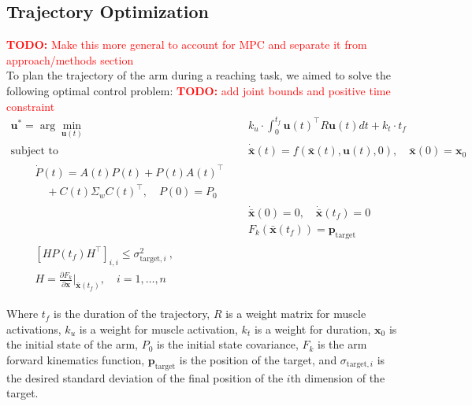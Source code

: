 \documentclass[letterpaper, 10pt, conference]{ieeeconf}
\newcommand{\todo}[1]{\textcolor{red}{\textbf{TODO:} #1}}
\begin{document}
\subsection{Trajectory Optimization}
\todo{Make this more general to account for MPC and separate it from approach/methods section} \\
To plan the trajectory of the arm during a reaching task, we aimed to solve the following optimal control problem:
\todo{add joint bounds and positive time constraint} \\
\begin{align}
    \mathbf{u}^* = \arg\min_{\mathbf{u}(t)} &\quad k_u \cdot \int_0^{t_f} \mathbf{u}(t)^\top R \mathbf{u}(t) dt + k_t \cdot t_f \label{eq:cost} \\
    \text{subject to} &\quad \mathbf{\dot{\bar{x}}}(t) = f(\mathbf{\bar{x}}(t), \mathbf{u}(t), 0), \quad \mathbf{\bar{x}}(0) = \mathbf{x}_0 \label{eq:dynamics_constraint} \\
    \begin{split}
    &\quad \dot{P}(t) = A(t)P(t) + P(t)A(t)^\top \\
    &\quad \quad + C(t) \Sigma_w C(t)^\top, \quad P(0) = P_0 
    \end{split}\label{eq:dynamics_constraint_p} \\
    &\quad \mathbf{\dot{\bar{x}}}(0) = 0, \quad \mathbf{\dot{\bar{x}}}(t_f) = 0 \label{eq:boundary_constraints} \\
    &\quad F_k(\mathbf{\bar{x}}(t_f)) = \mathbf{p}_{\text{target}} \label{eq:target_constraint} \\
    \begin{split}
    &\quad [HP(t_f)H^\top]_{i,i} \leq \sigma_{\text{target}, i}^2 \ , \\
    &\quad H = \frac{\partial F_k}{\partial \mathbf{x}}\bigg|_{\mathbf{\bar{x}}(t_f)}, \quad i = 1, \ldots, n 
    \end{split}\label{eq:target_variance_constraint}
\end{align}

Where $t_f$ is the duration of the trajectory, $R$ is a weight matrix for muscle activations, $k_u$ is a weight for muscle activation, $k_t$ is a weight for duration, $\mathbf{x}_0$ is the initial state of the arm, $P_0$ is the initial state covariance, $F_k$ is the arm forward kinematics function, $\mathbf{p}_{\text{target}}$ is the position of the target, and $\sigma_{\text{target}, i}$ is the desired standard deviation of the final position of the $i$th dimension of the target.
\end{document}
